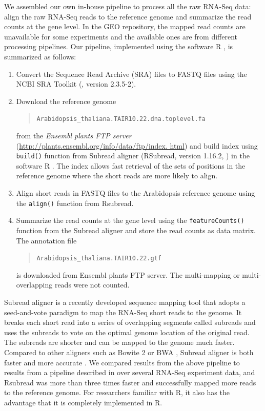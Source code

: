 \documentclass[fleqn,10pt,lineno]{wlpeerj} %
\begin{document}
We assembled our own in-house pipeline to process all the raw RNA-Seq data:
align the raw RNA-Seq reads to the reference genome and summarize the read counts at the 
gene level. In the GEO repository, the
mapped read counts are unavailable for some experiments and the available ones
are from different processing pipelines.  
Our pipeline, implemented using the software R \citep{Rpackage}, is summarized as follows: 
\begin{enumerate}
	\item Convert the Sequence Read Archive (SRA) files to FASTQ files using the NCBI SRA Toolkit 
	(\cite{leinonen2010sequence}, version 2.3.5-2).
	\item Download the reference genome 
	\begin{quote}
		\verb|Arabidopsis_thaliana.TAIR10.22.dna.toplevel.fa |
	\end{quote} 
	from the \textit{ Ensembl plants FTP server} 
	(\url{http://plants.ensembl.org/info/data/ftp/index. html}) and build index using 
	\verb|build()| function from 
	Subread aligner (RSubread, version 1.16.2, \citealt{liao2013subread}) in the software R
	\citep{ Rpackage}. The index allows fast retrieval of the sets of positions in the reference 
	genome where the short reads are more likely to align. 
	\item Align short reads in FASTQ files to the Arabidopsis reference genome using the 
	\verb|align()| function from Rsubread. 
	\item
	Summarize the read counts at the gene level using the \verb|featureCounts()| function from the
	Subread aligner
	and store the read counts as data matrix.  
	The annotation file 
	\begin{quote}
		\verb"Arabidopsis_thaliana.TAIR10.22.gtf" 
	\end{quote}
	is downloaded from Ensembl plants FTP server. The multi-mapping or
	multi-overlapping reads were not counted.  
	
\end{enumerate}
Subread aligner is a recently developed sequence mapping tool that adopts a
seed-and-vote paradigm to map the RNA-Seq short reads to the genome. 
It breaks each short read into a series of overlapping segments called
subreads and uses the subreads to vote on the optimal genome location of the
original read. The subreads are shorter and can be mapped to the genome much
faster.
Compared to other aligners such as Bowite 2 \citep{langmead2012fast} or BWA
\citep{li2009fast}, Subread aligner is both faster and more accurate
\citep{liao2013subread}. We compared results from the above
pipeline to results from a pipeline described in \citet{anders2013count} over several RNA-Seq 
experiment data, and Rsubread
was more than three times faster and successfully mapped more reads to the
reference genome.  For researchers familiar with R, it also has the advantage
that it is completely implemented in R.
\end{document}
